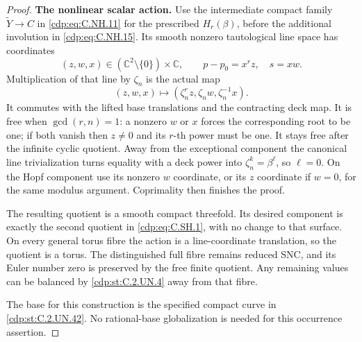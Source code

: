 \begin{proof}
\par\medskip\noindent\textbf{The nonlinear scalar action.}
Use the intermediate compact family $\widetilde Y\to C$ in
\eqref{cdp:eq:C.NH.11} for the prescribed $H_r(\beta)$, before the
additional involution in \eqref{cdp:eq:C.NH.15}. Its smooth nonzero
tautological line space has coordinates
\[
 (z,w,x)\in(\mathbb C^2\setminus\{0\})\times\mathbb C,
                   \qquad p-p_0=x^r z,\quad s=xw.
\tag{C.SH.12}\label{cdp:eq:C.SH.12}
\]
Multiplication of that line by $\zeta_n$ is the actual map
\[
 (z,w,x)\longmapsto
       (\zeta_n^r z,\zeta_n w,\zeta_n^{-1}x).
\tag{C.SH.13}\label{cdp:eq:C.SH.13}
\]
It commutes with the lifted base translations and the
contracting deck map. It is free when $\gcd(r,n)=1$:
a nonzero $w$ or $x$ forces the corresponding root to be
one; if both vanish then $z\ne0$ and its $r$-th power
must be one. It stays free after the infinite cyclic
quotient. Away from the exceptional component the
canonical line trivialization turns equality with a
deck power into $\zeta_n^k=\beta^\ell$, so $\ell=0$.
On the Hopf component use its nonzero $w$ coordinate,
or its $z$ coordinate if $w=0$, for the same modulus
argument. Coprimality then finishes the proof.

The resulting quotient is a smooth compact threefold.
Its desired component is exactly the second quotient
in \eqref{cdp:eq:C.SH.1}, with no change to that surface. On every
general torus fibre the action is a line-coordinate
translation, so the quotient is a torus. The distinguished
full fibre remains reduced SNC, and its Euler number
zero is preserved by the free finite quotient. Any
remaining values can be balanced by \ref{cdp:st:C.2.UN.4} away
from that fibre.

The base for this construction is the specified compact
curve in \ref{cdp:st:C.2.UN.42}. No rational-base globalization is
needed for this occurrence assertion.
\end{proof}